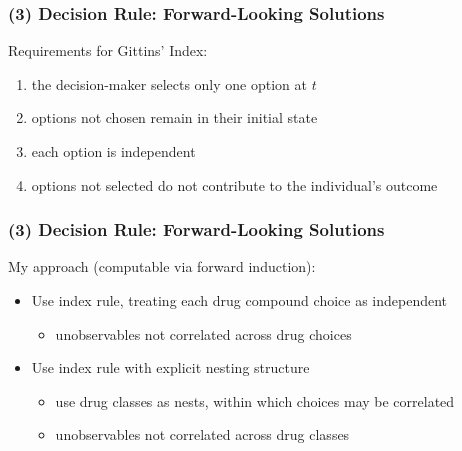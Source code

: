 \begin{frame}[label=DYNAM]

\frametitle{(3) Decision Rule: Forward-Looking Solutions}
\small

Requirements for Gittins' Index:

\begin{enumerate}
\item the decision-maker selects only one option at $t$

\item options not chosen remain in their initial state

\item each option is independent

\item options not selected do not contribute to the individual's outcome
\end{enumerate}

\hyperlink{GITTINS}{}
\end{frame}


\begin{frame}
\frametitle{(3) Decision Rule: Forward-Looking Solutions}
\small

My approach (computable via forward induction):

\begin{itemize}
\item Use index rule, treating each drug compound choice as independent

\begin{itemize}
\item unobservables not correlated across drug choices
\end{itemize}

\item Use index rule with explicit nesting structure

\begin{itemize}
\item use drug classes as nests, within which choices may be correlated

\item unobservables not correlated across drug classes
\end{itemize}
\end{itemize}
\end{frame}


